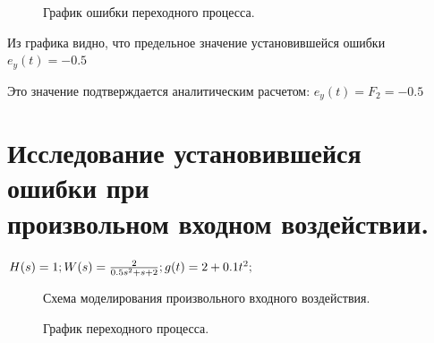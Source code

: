 \documentclass[a4paper, 11pt]{article}
\begin{document}
\begin{figure}[h]
    \caption{График ошибки переходного процесса.}
    \label{tree}
\end{figure}

\normalsize{Из графика видно, что предельное значение установившейся ошибки \\ $e_y(t)=-0.5$

Это значение подтверждается аналитическим расчетом:
$e_y(t)=F_2=-0.5$}
\newpage
\normalsize\section{{Исследование установившейся ошибки при \\ произвольном входном воздействии.}}
\normalsize{$H(s)=1; \\\\ W(s)=\frac {2} {0.5s^2+s+2}; \\\\  g(t)=2+0.1t^2;$}

\begin{figure}[h]
    \caption{Схема моделирования произвольного входного воздействия.}
    \label{two}
\end{figure}

\begin{figure}[h]
    \caption{График переходного процесса.}
    \label{two}
\end{figure}
    
\end{document}
